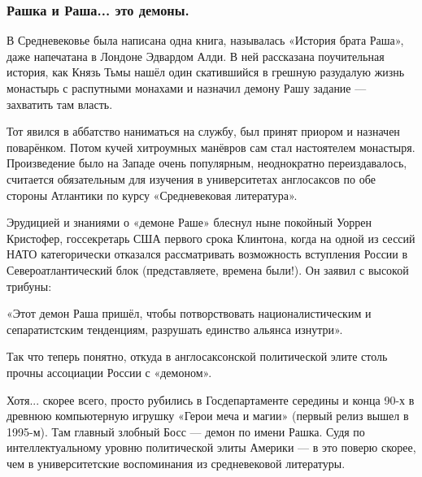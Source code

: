 \subsubsection{Рашка и Раша... это демоны.}

В Средневековье была написана одна книга, называлась «История брата Раша», даже
напечатана в Лондоне Эдвардом Алди. В ней рассказана поучительная история, как
Князь Тьмы нашёл один скатившийся в грешную разудалую жизнь монастырь с
распутными монахами и назначил демону Рашу задание — захватить там власть.

Тот явился в аббатство наниматься на службу, был принят приором и назначен
поварёнком. Потом кучей хитроумных манёвров сам стал настоятелем монастыря.
Произведение было на Западе очень популярным, неоднократно переиздавалось,
считается обязательным для изучения в университетах англосаксов по обе стороны
Атлантики по курсу «Средневековая литература».

Эрудицией и знаниями о «демоне Раше» блеснул ныне покойный Уоррен Кристофер,
госсекретарь США первого срока Клинтона, когда на одной из сессий НАТО
категорически отказался рассматривать возможность вступления России в
Североатлантический блок (представляете, времена были!). Он заявил с высокой
трибуны:

\begin{zznagolos}
«Этот демон Раша пришёл, чтобы потворствовать националистическим и
сепаратистским тенденциям, разрушать единство альянса изнутри».	
\end{zznagolos}

Так что теперь понятно, откуда в англосаксонской политической элите столь
прочны ассоциации России с «демоном».

Хотя... скорее всего, просто рубились в Госдепартаменте середины и конца 90-х в
древнюю компьютерную игрушку «Герои меча и магии» (первый релиз вышел в
1995-м). Там главный злобный Босс — демон по имени Рашка. Судя по
интеллектуальному уровню политической элиты Америки — в это поверю скорее, чем
в университетские воспоминания из средневековой литературы.
